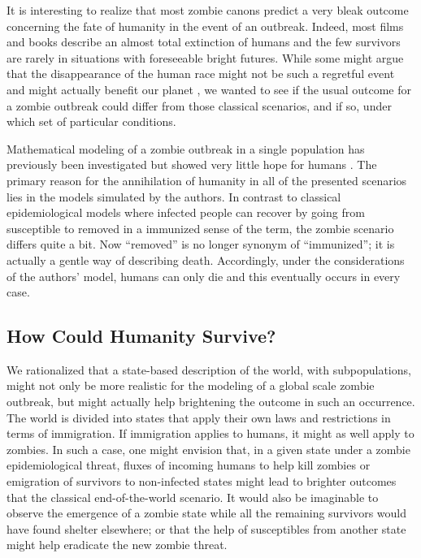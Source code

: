 \documentclass[11pt]{article} %
\begin{document}
It is interesting to realize that most zombie canons predict a very bleak outcome concerning the fate of humanity in the event of an outbreak. Indeed, most films and books describe an almost total extinction of humans and the few survivors are rarely in situations with foreseeable bright futures. While some might argue that the disappearance of the human race might not be such a regretful event and might actually benefit our planet \cite{paccalet2006humanite}, we wanted to see if the usual outcome for a zombie outbreak could differ from those classical scenarios, and if so, under which set of particular conditions. 

Mathematical modeling of a zombie outbreak in a single population has previously been investigated but showed very little hope for humans \cite{munz2009zombies}. The primary reason for the annihilation of humanity in all of the presented scenarios lies in the models simulated by the authors. In contrast to classical epidemiological models where infected people can recover by going from susceptible to removed in a immunized sense of the term, the zombie scenario differs quite a bit. Now ``removed'' is no longer synonym of ``immunized''; it is actually a gentle way of describing death. Accordingly, under the considerations of the authors' model, humans can only die and this eventually occurs in every case.



\subsection{How Could Humanity Survive?}\indent


We rationalized that a state-based description of the world, with subpopulations, might not only be more realistic for the modeling of a global scale zombie outbreak, but might actually help brightening the outcome in such an occurrence. The world is divided into states that apply their own laws and restrictions in terms of immigration. If immigration applies to humans, it might as well apply to zombies. In such a case, one might envision that, in a given state under a zombie epidemiological threat, fluxes of incoming humans to help kill zombies or emigration of survivors to non-infected states might lead to brighter outcomes that the classical end-of-the-world scenario. It would also be imaginable to observe the emergence of a zombie state while all the remaining survivors would have found shelter elsewhere; or that the help of susceptibles from another state might help eradicate the new zombie threat. 
\end{document}
